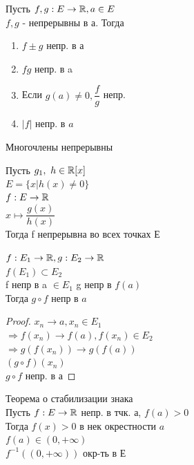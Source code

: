 \begin{properties}
	Пусть $ f, g : E \rightarrow \mathbb{R}, a \in E$ \\
	 $ f, g $ - непрерывны в а. Тогда \\
	 \begin{enumerate}
	 	\item $ f \pm g $ непр. в а
	 	\item $ fg $ непр. в a 
	 	\item Если  $ g(a) \neq 0, \dfrac{f}{g} $ непр.
	 	\item $|f|$ непр. в $a$
	 \end{enumerate}
 	Многочлены непрерывны 
	\begin{consequence}
		Пусть $ g_1, \ h \in \mathbb{R}[x] $ \\
		$ E = \{ x | h(x) \neq 0 \} $ \\
		$ f : E \rightarrow \mathbb{R} $ \\
		$ x \mapsto \dfrac{g(x)}{h(x)} $ \\
		Тогда f непрерывна во всех точках Е \\
		
 	\end{consequence}
 \begin{predl}
 	 $ f : E_1 \rightarrow \mathbb{R} , g : E_2 \rightarrow \mathbb{R}$ \\
 	$ f(E_1) \subset E_2 $ \\
 	f непр в a  $ \in E_1 $ g непр  в $ f(a)$\\
 	Тогда $ g \circ f $ непр в $ a $ 
 	\begin{proof}
 		$ x_n \rightarrow a, x_n \in E_1 $ \\
 		$ \Rightarrow f(x_n) \rightarrow f(a), f(x_n) \in E_2 $\\
 		$ \Rightarrow g(f(x_n))  \rightarrow g(f(a))$ \\
 		$ (g\circ f) (x_n) $\\
 		$ g \circ f $ непр. в а 	
 	\end{proof}
 \end{predl}
  \begin{theorem}
  	Теорема о стабилизации знака \\
  	Пусть $ f : E \rightarrow \mathbb{R}  $ непр. в тчк. а, $ f(a) > 0$\\
  	Тогда $ f(x) > 0 $ в нек окрестности $a$ \\
  	$ f(a) \in (0, +\infty) $ \\
  	$ f^{-1} ((0, +\infty)) $ окр-ть в Е
  \end{theorem}
\end{properties} 

